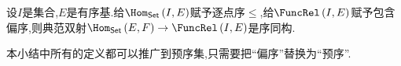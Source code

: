 \begin{proposition}{}{}
	设$I$是集合,$E$是有序基.给$\Hom_{\mathsf{Set}}\left(I,E\right)$赋予逐点序$\leq$,给$\FuncRel\left(I,E\right)$赋予包含偏序,则典范双射$\Hom_{\mathsf{Set}}\left(E,F\right)\to\FuncRel\left(I,E\right)$是序同构.
\end{proposition}

\begin{remark}{}{}
	本小结中所有的定义都可以推广到预序集,只需要把``偏序''替换为``预序''.
\end{remark}


























































